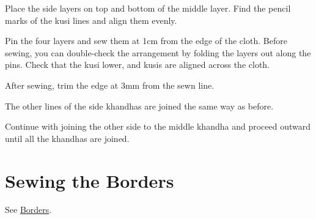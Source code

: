 Place the side layers on top and bottom of the middle layer. Find the
pencil marks of the kusi lines and align them evenly.





Pin the four layers and sew them at 1cm from the edge of the cloth.
Before sewing, you can double-check the arrangement by folding the
layers out along the pins. Check that the kusi lower, and kusis are
aligned across the cloth.






After sewing, trim the edge at 3mm from the sewn line.


The other lines of the side khandhas are joined the same way as before.

Continue with joining the other side to the middle khandha and proceed
outward until all the khandhas are joined.

\section{Sewing the Borders}

See \href{/en/borders}{Borders}.

